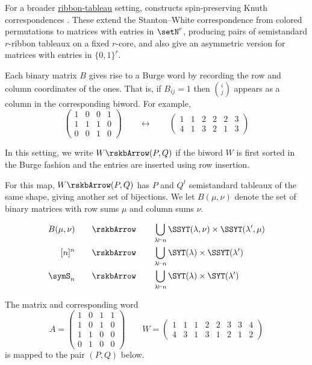 For a broader \hyperref[borderStripTableauxDefinition]{ribbon-tableau} setting,
constructs spin-preserving Knuth correspondences
\cite{Leeuwen2005Ribbon}.  These extend the Stanton--White correspondence
from colored permutations to matrices with entries in $\setN^r$, producing
pairs of semistandard $r$-ribbon tableaux on a fixed $r$-core, and also give
an asymmetric version for matrices with entries in $\{0,1\}^r$.

Each binary matrix $B$ gives rise to a Burge word by recording the row and
column coordinates of the ones.
That is, if $B_{ij}=1$ then $\binom{i}{j}$ appears as a column in the
corresponding biword.
For example,
\[
\begin{pmatrix}
1 & 0 & 0 & 1 \\
1 & 1 & 1 & 0 \\
0 & 0 & 1 & 0
\end{pmatrix}
\qquad
\longleftrightarrow
\qquad
\begin{pmatrix}
1 & 1 & 2 & 2 & 2 & 3 \\
4 & 1 & 3 & 2 & 1 & 3
\end{pmatrix}
\]

In this setting, we write $W \rskbArrow (P,Q)$ if the biword $W$ is
first sorted in the Burge fashion and the entries are inserted using row
insertion.

For this map, $W \rskbArrow (P,Q)$ has $P$ and $Q^t$ semistandard tableaux
of the same shape, giving another set of bijections.
We let $B(\mu,\nu)$ denote the
set of binary matrices with row sums $\mu$ and column sums $\nu$.

\begin{align}
B(\mu,\nu) & \qquad \rskbArrow \qquad \bigcup_{\lambda \vdash n} \SSYT(\lambda,\nu) \times \SSYT(\lambda',\mu) \\
[n]^n & \qquad \rskbArrow \qquad \bigcup_{\lambda \vdash n} \SYT(\lambda) \times \SSYT(\lambda') \\
\symS_n  & \qquad \rskbArrow \qquad \bigcup_{\lambda \vdash n} \SYT(\lambda) \times \SYT(\lambda')
\end{align}


\begin{example*}
The matrix and corresponding word
\begin{equation*}
A = \begin{pmatrix}
1 & 0 & 1 & 1 \\
1 & 0 & 1 & 0 \\
1 & 1 & 0 & 0 \\
0 & 1 & 0 & 0
\end{pmatrix}
\qquad
W=
\begin{pmatrix}
1& 1& 1& 2& 2& 3& 3& 4 \\
4& 3& 1& 3& 1& 2& 1& 2
\end{pmatrix}
\end{equation*}
is mapped to the pair $(P,Q)$ below.

\begin{figure}
\end{figure}
\end{example*}


